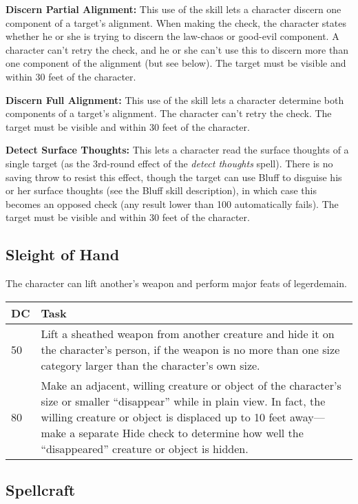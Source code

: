 \documentclass{article}
\begin{document}
\textbf{Discern Partial Alignment: }This use of the skill lets a character discern 
one component of a target's alignment. When making the check, the character states 
whether he or she is trying to discern the law-chaos or good-evil component. A 
character can't retry the check, and he or she can't use this to discern more than 
one component of the alignment (but see below). The target must be visible and 
within 30 feet of the character. 

\textbf{Discern Full Alignment: }This use of the skill lets a character determine 
both components of a target's alignment. The character can't retry the check. The 
target must be visible and within 30 feet of the character. 

\textbf{Detect Surface Thoughts: }This lets a character read the surface thoughts 
of a single target (as the 3rd-round effect of the \textit{detect thoughts }spell). 
There is no saving throw to resist this effect, though the target can use Bluff 
to disguise his or her surface thoughts (see the Bluff skill description), in which 
case this becomes an opposed check (any result lower than 100 automatically fails). 
The target must be visible and within 30 feet of the character.

\vspace{12pt}
\subsection*{Sleight of Hand }

The character can lift another's weapon and perform major feats of legerdemain. 

\begin{tabular}{|>{\raggedright}p{11pt}|>{\raggedright}p{315pt}|}
\hline
D\textbf{C} &  \textbf{Task}\tabularnewline
\hline
50  & Lift a sheathed weapon from another creature and hide it on the character's 
person, if the weapon is no more than one size category larger than the character's 
own size. \tabularnewline
\hline
80 & Make an adjacent, willing creature or object of the character's size or smaller 
``disappear'' while in plain view. In fact, the willing creature or object is displaced 
up to 10 feet away---make a separate Hide check to determine how well the ``disappeared'' 
creature or object is hidden. \tabularnewline
\hline
\end{tabular}

\vspace{12pt}
\subsection*{Spellcraft }
\end{document}
